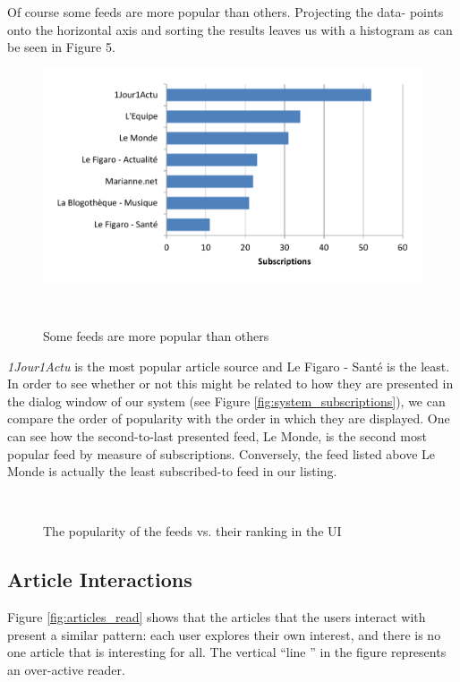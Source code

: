 Of course some feeds are more popular than others. Projecting the data- points onto the horizontal axis and sorting the results leaves us with a histogram as can be seen in Figure 5.

\begin{figure}[h!]
\centering
  \includegraphics[width=\columnwidth]{figures/feed_popularity}
  \caption{Some feeds are more popular than others}~\label{fig:registrations}
\end{figure}


{\em 1Jour1Actu} is the most popular article source and Le Figaro - Sant\'e is the least. In order to see whether or not this might be related to how they are presented in the dialog window of our system (see Figure \ref{fig:system_subscriptions}), we can compare the order of popularity with the order in which they are displayed. One can see how the second-to-last presented feed, Le Monde, is the second most popular feed by measure of subscriptions. Conversely, the feed listed above Le Monde is actually the least subscribed-to feed in our listing.


\begin{figure}[h!]
\centering
  
  \caption{The popularity of the feeds vs. their ranking in the UI}~\label{fig:registrations}
\end{figure}




\subsection{Article Interactions}
Figure \ref{fig:articles_read} shows that the articles that the users interact with present a similar pattern: each user explores their own interest, and there is no one article that is interesting for all. The vertical ``line '' in the figure represents an over-active reader.

